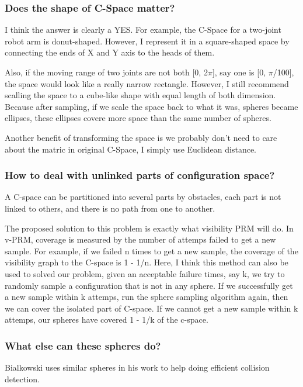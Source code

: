 \documentclass{article}
\begin{document}
    \subsubsection{Does the shape of C-Space matter? }
      I think the answer is clearly a YES. For example, the C-Space for a two-joint robot arm is donut-shaped. However, I represent it in a square-shaped space by connecting the ends of X and Y axis to the heads of them. 

      Also, if the moving range of two joints are not both [0, 2$\pi$], say one is [0, $\pi$/100], the space would look like a really narrow rectangle. However, I still recommend scalling the space to a cube-like shape with equal length of both dimension. Because after sampling, if we scale the space back to what it was, spheres became ellipses, these ellipses covere more space than the same number of spheres. 

      Another benefit of transforming the space is we probably don't need to care about the matric in original C-Space, I simply use Euclidean distance. 

    \subsubsection{How to deal with unlinked parts of configuration space?}
      A C-space can be partitioned into several parts by obstacles, each part is not linked to others, and there is no path from one to another. 

      The proposed solution to this problem is exactly what visibility PRM will do. In v-PRM, coverage is measured by the number of attemps failed to get a new sample. For example, if we failed n times to get a new sample, the coverage of the visibility graph to the C-space is 1 - 1/n. Here, I think this method can also be used to solved our problem, given an acceptable failure times, say k, we try to randomly sample a configuration that is not in any sphere. If we successfully get a new sample within k attemps, run the sphere sampling algorithm again, then we can cover the isolated part of C-space. If we cannot get a new sample within k attemps, our spheres have covered 1 - 1/k of the c-space. 

    \subsubsection{What else can these spheres do?}
      Bialkowski uses similar spheres in his work \cite{Bialkowski2012} to help doing efficient collision detection.
\end{document}
